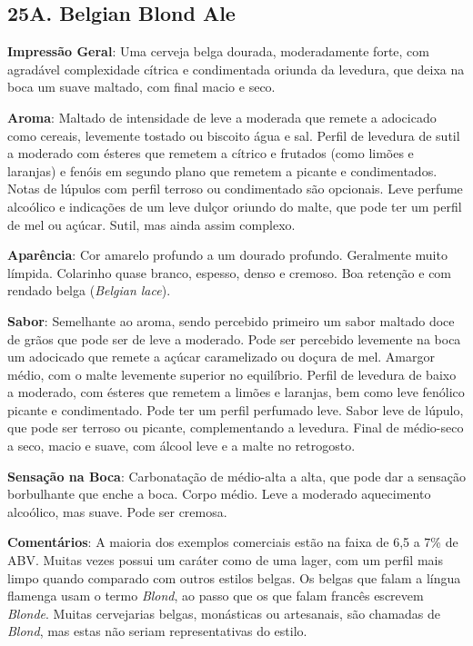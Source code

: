 \subsection*{25A. Belgian Blond Ale}
\textbf{Impressão Geral}: Uma cerveja belga dourada, moderadamente forte, com agradável complexidade cítrica e condimentada oriunda da levedura, que deixa na boca um suave maltado, com final macio e seco.

\textbf{Aroma}: Maltado de intensidade de leve a moderada que remete a adocicado como cereais, levemente tostado ou biscoito água e sal. Perfil de levedura de sutil a moderado com ésteres que remetem a cítrico e frutados (como limões e laranjas) e fenóis em segundo plano que remetem a picante e condimentados. Notas de lúpulos com perfil terroso ou condimentado são opcionais. Leve perfume alcoólico e indicações de um leve dulçor oriundo do malte, que pode ter um perfil de mel ou açúcar. Sutil, mas ainda assim complexo.

\textbf{Aparência}: Cor amarelo profundo a um dourado profundo. Geralmente muito límpida. Colarinho quase branco, espesso, denso e cremoso. Boa retenção e com rendado belga (\textit{Belgian lace}).

\textbf{Sabor}: Semelhante ao aroma, sendo percebido primeiro um sabor maltado doce de grãos que pode ser de leve a moderado. Pode ser percebido levemente na boca um adocicado que remete a açúcar caramelizado ou doçura de mel. Amargor médio, com o malte levemente superior no equilíbrio. Perfil de levedura de baixo a moderado, com ésteres que remetem a limões e laranjas, bem como leve fenólico picante e condimentado. Pode ter um perfil perfumado leve. Sabor leve de lúpulo, que pode ser terroso ou picante, complementando a levedura. Final de médio-seco a seco, macio e suave, com álcool leve e a malte no retrogosto.

\textbf{Sensação na Boca}: Carbonatação de médio-alta a alta, que pode dar a sensação borbulhante que enche a boca. Corpo médio. Leve a moderado aquecimento alcoólico, mas suave. Pode ser cremosa.

\textbf{Comentários}: A maioria dos exemplos comerciais estão na faixa de 6,5 a 7\% de ABV. Muitas vezes possui um caráter como de uma lager, com um perfil mais limpo quando comparado com outros estilos belgas. Os belgas que falam a língua flamenga usam o termo \textit{Blond}, ao passo que os que falam francês escrevem \textit{Blonde}. Muitas cervejarias belgas, monásticas ou artesanais, são chamadas de \textit{Blond}, mas estas não seriam representativas do estilo.

